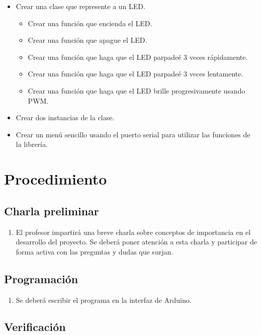 \documentclass[12pt,letterpaper]{IEEEtran}
\begin{document}
\begin{itemize}
	\item Crear una clase que represente a un LED.
	\begin{itemize}
	\item Crear una función que encienda el LED.
		\item Crear una función que apague el LED.
		\item Crear una función que haga que el LED parpadeé 3 veces rápidamente.
		\item Crear una función que haga que el LED parpadeé 3 veces lentamente.
		\item Crear una función que haga que el LED brille progresivamente usando PWM.		
	\end{itemize}
	\item Crear dos instancias de la clase. 
	\item Crear un menú sencillo usando el puerto serial para utilizar las funciones de la librería.
\end{itemize}

\section{Procedimiento}

\subsection{Charla preliminar}

\begin{enumerate}
	\item El profesor impartirá una breve charla sobre conceptos de importancia en el desarrollo del proyecto. Se deberá poner atención a esta charla y participar de forma activa con las preguntas y dudas que surjan.
\end{enumerate}


\subsection{Programación}

\begin{enumerate}[resume]
	\item Se deberá escribir el programa en la interfaz de Arduino.
\end{enumerate}

\subsection{Verificación}
\end{document}
